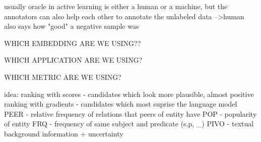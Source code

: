 usually oracle in active learning is either a human or a machine, but the annotators can also help each other to annotate the unlabeled data -->human also says how "good" a negative sample was


WHICH EMBEDDING ARE WE USING??


WHICH APPLICATION ARE WE USING?


WHICH METRIC ARE WE USING?


idea:
ranking with scores - candidates which look more plausible, almost positive
ranking with gradients - candidates which most suprise the language model
PEER - relative frequency of relations that peers of entity have
POP - popularity of entity
FRQ - frequency of same subject and predicate (s,p, \_)
PIVO - textual background information
+ uncertainty

